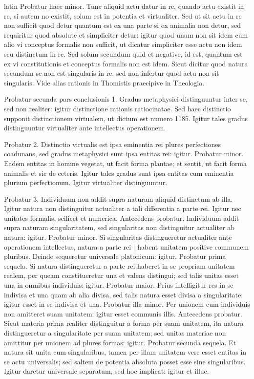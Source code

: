 \begin{otherlanguage*}{latin}
\pstart
 Probatur haec minor. Tunc aliquid actu datur in re, quando actu existit in re, si autem no existit, solum est in potentia et virtualiter. Sed ut sit actu in re non sufficit quod detur quantum est ex una parte si ex animalia non detur, sed requiritur quod absolute et simpliciter detur: igitur quod unum non sit idem cum alio vi conceptus formalis non sufficit, ut dicatur simpliciter esse actu non idem seu distinctum in re. Sed solum secundum quid et negative, id est, quantum est ex vi constitutionis et conceptus formalis non est idem. Sicut dicitur quod natura secundum se non est singularis in re, sed non infertur quod actu non sit singularis. Vide alias rationis in Thomistis praecipive in Theologia. 
\pend

\pstart
 Probatur secunda pars conclusionis 1. Gradus metaphysici distinguuntur inter se, sed non realiter: igitur distinctione rationis ratiocinatae. Sed haec distinctio supponit distinctionem virtualem, ut dictum est numero 1185. Igitur tales gradus distinguuntur virtualiter ante intellectus operationem. 
\pend

\pstart
 Probatur 2. Distinctio virtualis est ipsa eminentia rei plures perfectiones coadunans, sed gradus metaphysici sunt ipsa entitas rei: igitur. Probatur minor. Eadem entitas in homine vegetat, ut facit forma plantae; et sentit, ut facit forma animalis et sic de ceteris. Igitur tales gradus sunt ipsa entitas cum eminentia plurium perfectionum. Igitur virtualiter distinguuntur. 
\pend

\pstart
 Probatur 3. Individuum non addit supra naturam aliquid distinctum ab illa. Igitur natura non distinguitur actualiter a tali differentia a parte rei. Igitur nec unitates formalis, scilicet et numerica. Antecedens probatur. Individuum addit supra naturam singularitatem, sed singularitas non distinguitur actualiter ab natura: igitur. Probatur minor. Si singularitas distingueretur actualiter ante operationem intellectus, natura a parte rei \textnormal{|} habent unitatem positive communem pluribus. Deinde sequeretur universale platonicum: igitur. Probatur prima sequela. Si natura distingueretur a parte rei haberet in se propriam unitatem realem, per queam constitueretur una et valens distingui; sed talis unitas esset una in omnibus individuis: igitur. Probatur maior. Prius intelligitur res in se indivisa et una quam ab alia divisa, sed talis natura esset divisa a singularitate: igitur esset in se indivisa et una. Probatur illa minor. Per unionem cum individuis non amitteret suam unitatem: igitur esset communis illis. Antecedens probatur. Sicut materia prima realiter distinguitur a forma per suam unitatem, ita natura distingueretur a singularitate per suam unitatem; sed unitas materiae non amittitur per unionem ad plures formas: igitur. Probatur secunda sequela. Et natura sit unita cum singularibus, tamen per illam unitatem vere esset entitas in se actu universalis; sed saltem de potentia absoluta posset esse sine singularibus. Igitur daretur universale separatum, sed hoc implicat: igitur et illuc. 
\pend


\end{otherlanguage*}
